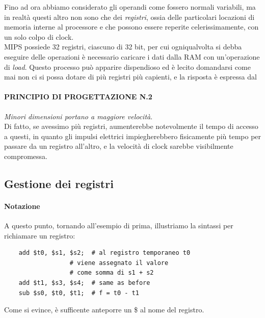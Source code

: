 \documentclass[class=book, crop=false]{standalone}
\begin{document}
Fino ad ora abbiamo considerato gli operandi come fossero normali variabili, ma in realtà questi altro non sono che dei \emph{registri}, ossia delle particolari locazioni di memoria interne al processore e che possono essere reperite celerissimamente, con un solo colpo di clock.\\
MIPS possiede 32 registri, ciascuno di 32 bit, per cui ogniqualvolta si debba eseguire delle operazioni è necessario caricare i dati dalla RAM con un'operazione di \emph{load}. Questo processo può apparire dispendioso ed è lecito domandarsi come mai non ci si possa dotare di più registri più capienti, e la risposta è espressa dal

\paragraph{PRINCIPIO DI PROGETTAZIONE N.2}
\emph{Minori dimensioni portano a maggiore velocità}.\\

Di fatto, se avessimo  più registri, aumenterebbe notevolmente il tempo di accesso a questi, in quanto gli impulsi elettrici impiegherebbero fisicamente più tempo per passare da un registro all'altro, e la velocità di clock sarebbe visibilmente compromessa.

\subsection{Gestione dei registri}

\paragraph{Notazione}
A questo punto, tornando all'esempio di prima, illustriamo la sintassi per richiamare un registro:
\begin{verbatim}
	add $t0, $s1, $s2;	# al registro temporaneo t0
				  # viene assegnato il valore
				  # come somma di s1 + s2
	add $t1, $s3, $s4;	# same as before
	sub $s0, $t0, $t1;	# f = t0 - t1
\end{verbatim}
Come si evince, è sufficente anteporre un \$ al nome del registro.
\end{document}
